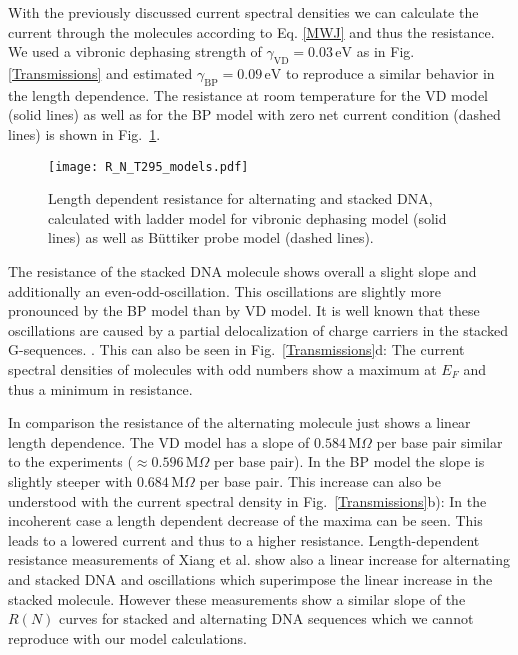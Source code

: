 \documentclass[reprint,superscriptaddress,nofootinbib,amsmath,amssymb,prb,floatfix]{revtex4-1}
\begin{document}
With the previously discussed current spectral densities we can calculate the current through the
molecules according to Eq. \eqref{MWJ} and thus the resistance. We used a vibronic dephasing
strength of $\gamma_\text{VD} = 0.03\,\text{eV}$ as in Fig. \ref{Transmissions} and estimated
$\gamma_{\text{BP}} = 0.09\,\text{eV}$ to reproduce a similar behavior in the length dependence.
The resistance at room temperature for the VD model (solid lines) as well as for the BP model with
zero net current condition (dashed lines) is shown in Fig.~\ref{R_N}.

\begin{figure}[b]
  \texttt{[image: R\_N\_T295\_models.pdf]}
  \caption{Length dependent resistance for alternating and stacked DNA, 
calculated with ladder model for vibronic dephasing model (solid lines) as well 
as B\"uttiker probe model (dashed lines).}
 \label{R_N}
\end{figure}

The resistance of the stacked DNA molecule shows overall a slight slope and additionally an
even-odd-oscillation. This oscillations are slightly more pronounced by the BP model than by VD
model.  It is well known that these oscillations are caused by a partial delocalization of charge
carriers in the stacked G-sequences. \cite{kim_intermediate_2016}.  This can also be seen in
Fig.~\ref{Transmissions}d: The current spectral densities of molecules with odd numbers show a
maximum at $E_F$ and thus a minimum in resistance. 

In comparison the resistance of the alternating molecule just shows a linear 
length dependence. The VD model has a slope of 
$0.584$\,M$\Omega$ per base pair  similar to the 
experiments\cite{xiang_intermediate_2015} ($\approx 0.596$\,M$\Omega$ per
base pair). In the BP model the slope is slightly steeper with
$0.684$\,M$\Omega$ per base pair. 
This increase can also be understood with the current spectral density in 
Fig.~\ref{Transmissions}b): In the incoherent case a length dependent decrease 
of the maxima can be seen. This leads to a lowered current and thus to a higher 
resistance.
Length-dependent resistance measurements of Xiang et al. \cite{xiang_intermediate_2015} show also a linear increase for alternating  and stacked DNA and oscillations which superimpose the 
linear increase in the stacked molecule.  However these measurements show a similar slope of the $R(N)$ curves for stacked and alternating DNA sequences which we cannot reproduce with our model calculations.
\end{document}
